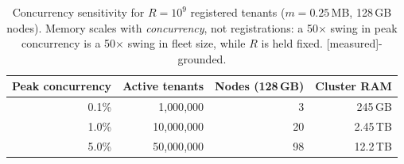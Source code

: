 \documentclass[11pt]{article}
\newcommand{\meas}{\textcolor{blue!60!black}{\small[measured]}}
\newcommand{\modeled}{\textcolor{orange!70!black}{\small[modeled]}}
\begin{document}
\begin{table}[h]
\centering
\caption{Capacity at \textbf{1\% peak concurrency}, \textbf{128\,GB} nodes ($U=125$\,GB), from
Eq.~\ref{eq:model} with the \meas{} $m=0.25$\,MB constant (and the \modeled{} $m=1.0$\,MB
conservative envelope). ``Cluster RAM'' is consumed RAM per Eq.~\ref{eq:model}, not provisioned.
Node counts are floored at 3 for HA.}
\label{tab:cap}
\end{table}

\begin{table}[h]
\centering
\caption{Concurrency sensitivity for $R = 10^9$ registered tenants ($m=0.25$\,MB, 128\,GB nodes).
Memory scales with \emph{concurrency}, not registrations: a 50$\times$ swing in peak concurrency
is a 50$\times$ swing in fleet size, while $R$ is held fixed. \meas{}-grounded.}
\label{tab:conc}
\begin{tabular}{r r r r}
\toprule
Peak concurrency & Active tenants & Nodes (128\,GB) & Cluster RAM \\
\midrule
0.1\% & 1{,}000{,}000  & 3   & 245\,GB \\
1.0\% & 10{,}000{,}000 & 20  & 2.45\,TB \\
5.0\% & 50{,}000{,}000 & 98  & 12.2\,TB \\
\bottomrule
\end{tabular}
\end{table}
\end{document}
